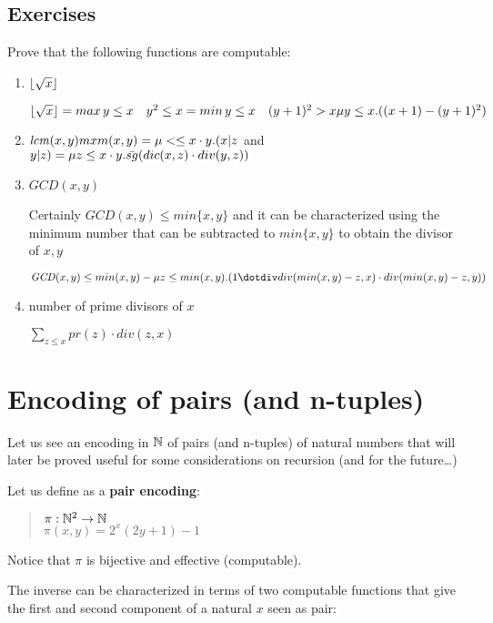 \subsection{Exercises}
Prove that the following functions are computable:

\begin{enumerate}[label=\alph*)]
\item $\lfloor\sqrt{x}\rfloor$

  $\lfloor\sqrt{x}\rfloor = max\, y\leq x \quad y^2 \leq x\\
  = min \, y \leq x \quad (y+1)^2 > x\\
  \mu y\leq x. ((x+1)-(y+1)^2)$
\item $\mathit{lcm}(x,y)\\
  mxm(x,y) = \mu < \leq x\cdot y . (x|z $ and $ y|z)\\
  = \mu z \leq x\cdot y. \bar{sg}(dic(x,z)\cdot div(y,z))$
\item $\mathit{GCD}(x,y)$

  Certainly $\mathit{GCD}(x,y)\leq min\{x,y\}$ and it can be characterized using the minimum number that can be subtracted to $min\{x,y\}$ to obtain the divisor of $x,y$

  $\mathit{GCD}(x,y)\leq min(x,y)-\mu z\leq min(x,y).(1\dotdiv div(min(x,y)-z,x)\cdot div(min(x,y)-z, y))$
\item number of prime divisors of $x$

  $\sum_{z\leq x} pr(z)\cdot div(z,x)$
\end{enumerate}

\section{Encoding of pairs (and n-tuples)}

Let us see an encoding in $\mathbb{N}$ of pairs (and n-tuples) of natural numbers that will later be proved useful for some considerations on recursion (and for the future\dots)

Let us define as a \textbf{pair encoding}:
\begin{quote}
  $\pi: \mathbb{N}^2\rightarrow\mathbb{N}$\\  
  $\pi(x,y) = 2^x(2y+1)-1$
\end{quote}

Notice that $\pi$ is bijective and effective (computable).

The inverse can be characterized in terms of two computable functions that give the first and second component of a natural $x$ seen as pair:

